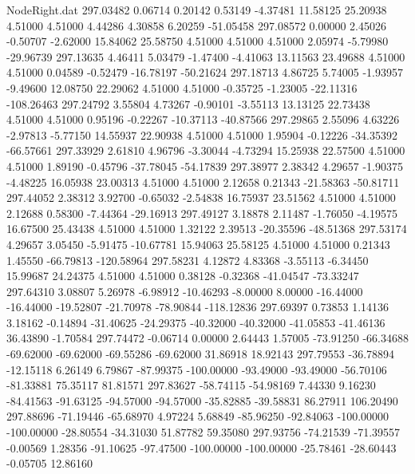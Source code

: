 \begin{filecontents}{NodeRight.dat}
 297.03482    0.06714    0.20142     0.53149   -4.37481   11.58125   25.20938    4.51000    4.51000    4.44286    4.30858    6.20259  -51.05458
 297.08572    0.00000    2.45026    -0.50707   -2.62000   15.84062   25.58750    4.51000    4.51000    4.51000    2.05974   -5.79980  -29.96739
 297.13635    4.46411    5.03479    -1.47400   -4.41063   13.11563   23.49688    4.51000    4.51000    0.04589   -0.52479  -16.78197  -50.21624
 297.18713    4.86725    5.74005    -1.93957   -9.49600   12.08750   22.29062    4.51000    4.51000   -0.35725   -1.23005  -22.11316 -108.26463
 297.24792    3.55804    4.73267    -0.90101   -3.55113   13.13125   22.73438    4.51000    4.51000    0.95196   -0.22267  -10.37113  -40.87566
 297.29865    2.55096    4.63226    -2.97813   -5.77150   14.55937   22.90938    4.51000    4.51000    1.95904   -0.12226  -34.35392  -66.57661
 297.33929    2.61810    4.96796    -3.30044   -4.73294   15.25938   22.57500    4.51000    4.51000    1.89190   -0.45796  -37.78045  -54.17839
 297.38977    2.38342    4.29657    -1.90375   -4.48225   16.05938   23.00313    4.51000    4.51000    2.12658    0.21343  -21.58363  -50.81711
 297.44052    2.38312    3.92700    -0.65032   -2.54838   16.75937   23.51562    4.51000    4.51000    2.12688    0.58300   -7.44364  -29.16913
 297.49127    3.18878    2.11487    -1.76050   -4.19575   16.67500   25.43438    4.51000    4.51000    1.32122    2.39513  -20.35596  -48.51368
 297.53174    4.29657    3.05450    -5.91475  -10.67781   15.94063   25.58125    4.51000    4.51000    0.21343    1.45550  -66.79813 -120.58964
 297.58231    4.12872    4.83368    -3.55113   -6.34450   15.99687   24.24375    4.51000    4.51000    0.38128   -0.32368  -41.04547  -73.33247
 297.64310    3.08807    5.26978    -6.98912  -10.46293   -8.00000    8.00000  -16.44000  -16.44000  -19.52807  -21.70978  -78.90844 -118.12836
 297.69397    0.73853    1.14136     3.18162   -0.14894  -31.40625  -24.29375  -40.32000  -40.32000  -41.05853  -41.46136   36.43890   -1.70584
 297.74472   -0.06714    0.00000     2.64443    1.57005  -73.91250  -66.34688  -69.62000  -69.62000  -69.55286  -69.62000   31.86918   18.92143
 297.79553  -36.78894  -12.15118     6.26149    6.79867  -87.99375 -100.00000  -93.49000  -93.49000  -56.70106  -81.33881   75.35117   81.81571
 297.83627  -58.74115  -54.98169     7.44330    9.16230  -84.41563  -91.63125  -94.57000  -94.57000  -35.82885  -39.58831   86.27911  106.20490
 297.88696  -71.19446  -65.68970     4.97224    5.68849  -85.96250  -92.84063 -100.00000 -100.00000  -28.80554  -34.31030   51.87782   59.35080
 297.93756  -74.21539  -71.39557    -0.00569    1.28356  -91.10625  -97.47500 -100.00000 -100.00000  -25.78461  -28.60443   -0.05705   12.86160

\end{filecontents}
